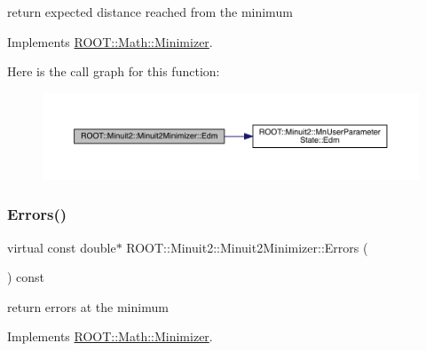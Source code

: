 return expected distance reached from the minimum 



Implements \mbox{\hyperlink{classROOT_1_1Math_1_1Minimizer_a990c6935849a3fb31aedab1df6c26f28}{R\+O\+O\+T\+::\+Math\+::\+Minimizer}}.

Here is the call graph for this function\+:
\nopagebreak
\begin{figure}[H]
\begin{center}
\leavevmode
\includegraphics[width=350pt]{d0/d9c/classROOT_1_1Minuit2_1_1Minuit2Minimizer_ab9c1bfaaaf4c12acd1fd96ece3509269_cgraph}
\end{center}
\end{figure}
\mbox{\label{classROOT_1_1Minuit2_1_1Minuit2Minimizer_a69c6dd9654ce41856814b358570cb9d7}} 
\subsubsection{\texorpdfstring{Errors()}{Errors()}\hspace{0.1cm}{\footnotesize\ttfamily [1/2]}}
{\footnotesize\ttfamily virtual const double$\ast$ R\+O\+O\+T\+::\+Minuit2\+::\+Minuit2\+Minimizer\+::\+Errors (\begin{DoxyParamCaption}{ }\end{DoxyParamCaption}) const\hspace{0.3cm}{\ttfamily [virtual]}}



return errors at the minimum 



Implements \mbox{\hyperlink{classROOT_1_1Math_1_1Minimizer_a42f71e22f16cf4c59b621cf7e1e75f3d}{R\+O\+O\+T\+::\+Math\+::\+Minimizer}}.

\mbox{\label{classROOT_1_1Minuit2_1_1Minuit2Minimizer_a69c6dd9654ce41856814b358570cb9d7}} 
